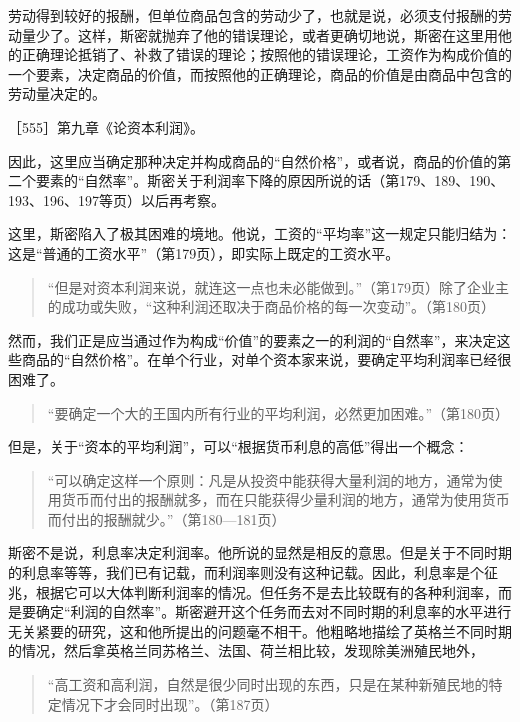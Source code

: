 劳动得到较好的报酬，但单位商品包含的劳动少了，也就是说，必须支付报酬的劳动量少了。这样，斯密就抛弃了他的错误理论，或者更确切地说，斯密在这里用他的正确理论抵销了、补救了错误的理论；按照他的错误理论，工资作为构成价值的一个要素，决定商品的价值，而按照他的正确理论，商品的价值是由商品中包含的劳动量决定的。

［555］第九章《论资本利润》。

因此，这里应当确定那种决定并构成商品的“自然价格”，或者说，商品的价值的第二个要素的“自然率”。斯密关于利润率下降的原因所说的话（第179、189、190、193、196、197等页）以后再考察。

这里，斯密陷入了极其困难的境地。他说，工资的“平均率”这一规定只能归结为：这是“普通的工资水平”（第179页），即实际上既定的工资水平。

\begin{quote}{“但是对资本利润来说，就连这一点也未必能做到。”（第179页）除了企业主的成功或失败，“这种利润还取决于商品价格的每一次变动”。（第180页）}\end{quote}

然而，我们正是应当通过作为构成“价值”的要素之一的利润的“自然率”，来决定这些商品的“自然价格”。在单个行业，对单个资本家来说，要确定平均利润率已经很困难了。

\begin{quote}{“要确定一个大的王国内所有行业的平均利润，必然更加困难。”（第180页）}\end{quote}

但是，关于“资本的平均利润”，可以“根据货币利息的高低”得出一个概念：

\begin{quote}{“可以确定这样一个原则：凡是从投资中能获得大量利润的地方，通常为使用货币而付出的报酬就多，而在只能获得少量利润的地方，通常为使用货币而付出的报酬就少。”（第180—181页）}\end{quote}

斯密不是说，利息率决定利润率。他所说的显然是相反的意思。但是关于不同时期的利息率等等，我们已有记载，而利润率则没有这种记载。因此，利息率是个征兆，根据它可以大体判断利润率的情况。但任务不是去比较既有的各种利润率，而是要确定“利润的自然率”。斯密避开这个任务而去对不同时期的利息率的水平进行无关紧要的研究，这和他所提出的问题毫不相干。他粗略地描绘了英格兰不同时期的情况，然后拿英格兰同苏格兰、法国、荷兰相比较，发现除美洲殖民地外，

\begin{quote}{“高工资和高利润，自然是很少同时出现的东西，只是在某种新殖民地的特定情况下才会同时出现”。（第187页）}\end{quote}

